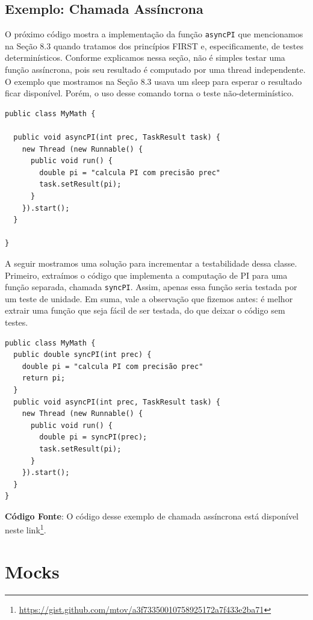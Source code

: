 \documentclass[
  11pt,
  twoside]{book}
\newcommand{\passthrough}[1]{#1}
\DeclareRobustCommand{\href}[2]{#2\footnote{\url{#1}}}
\begin{document}
\hypertarget{exemplo-chamada-assuxedncrona}{%
\subsection{Exemplo: Chamada
Assíncrona}\label{exemplo-chamada-assuxedncrona}}

O próximo código mostra a implementação da função
\passthrough{\lstinline!asyncPI!} que mencionamos na Seção 8.3 quando
tratamos dos princípios FIRST e, especificamente, de testes
determinísticos. Conforme explicamos nessa seção, não é simples testar
uma função assíncrona, pois seu resultado é computado por uma thread
independente. O exemplo que mostramos na Seção 8.3 usava um sleep para
esperar o resultado ficar disponível. Porém, o uso desse comando torna o
teste não-determinístico.

\begin{lstlisting}
public class MyMath {

  public void asyncPI(int prec, TaskResult task) { 
    new Thread (new Runnable() {
      public void run() {
        double pi = "calcula PI com precisão prec"
        task.setResult(pi);
      }
    }).start();
  }

} 
\end{lstlisting}

A seguir mostramos uma solução para incrementar a testabilidade dessa
classe. Primeiro, extraímos o código que implementa a computação de PI
para uma função separada, chamada \passthrough{\lstinline!syncPI!}.
Assim, apenas essa função seria testada por um teste de unidade. Em
suma, vale a observação que fizemos antes: é melhor extrair uma função
que seja fácil de ser testada, do que deixar o código sem testes.

\begin{lstlisting}
public class MyMath {
  public double syncPI(int prec) {
    double pi = "calcula PI com precisão prec"
    return pi;
  }
  public void asyncPI(int prec, TaskResult task) { 
    new Thread (new Runnable() {
      public void run() {
        double pi = syncPI(prec);
        task.setResult(pi);
      }    
    }).start();
  }
}  
\end{lstlisting}

\textbf{Código Fonte}: O código desse exemplo de chamada assíncrona está
disponível neste
\href{https://gist.github.com/mtov/a3f73350010758925172a7f433e2ba71}{link}.

\hypertarget{mocks}{%
\section{Mocks}\label{mocks}}
\end{document}
